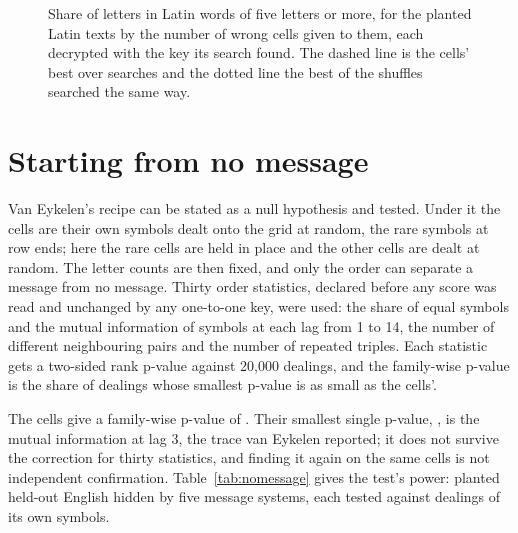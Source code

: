 \documentclass[11pt]{article}
\theoremstyle{definition}
\begin{document}
\begin{figure}[t]
\centering

\caption{Share of letters in Latin words of five letters or more, for the \lwdPlanted{} planted Latin texts by the number of wrong cells given to them, each decrypted with the key its search found. The dashed line is the cells' best over \lwdSearches{} searches and the dotted line the best of the \lwdShuffles{} shuffles searched the same way.}
\label{fig:words}
\end{figure}

\section{Starting from no message}\label{sec:nomessage}

Van Eykelen's recipe \cite{vaneykelen2026xv} can be stated as a null hypothesis and tested. Under it the cells are their own symbols dealt onto the grid at random, the rare symbols at row ends; here the \nmFixed{} rare cells are held in place and the other cells are dealt at random. The letter counts are then fixed, and only the order can separate a message from no message. Thirty order statistics, declared before any score was read and unchanged by any one-to-one key, were used: the share of equal symbols and the mutual information of symbols at each lag from 1 to 14, the number of different neighbouring pairs and the number of repeated triples. Each statistic gets a two-sided rank p-value against 20,000 dealings, and the family-wise p-value is the share of dealings whose smallest p-value is as small as the cells'.

The cells give a family-wise p-value of \nmFamilyP{}. Their smallest single p-value, \nmSmallestP{}, is the mutual information at lag 3, the trace van Eykelen reported; it does not survive the correction for thirty statistics, and finding it again on the same cells is not independent confirmation. Table~\ref{tab:nomessage} gives the test's power: planted held-out English hidden by five message systems, each tested against dealings of its own symbols.
\end{document}
